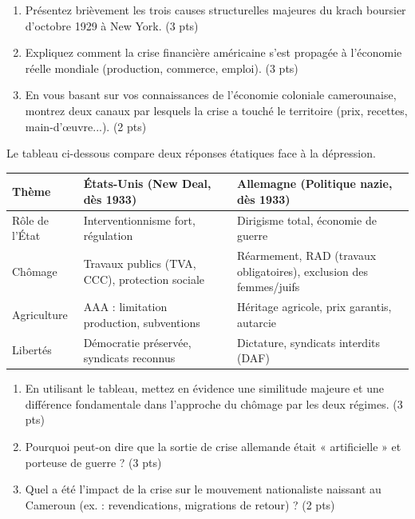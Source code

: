 \documentclass[11pt]{article}
\begin{document}
\begin{exercice}
\begin{enumerate}
    \item Présentez brièvement les trois causes structurelles majeures du krach boursier d'octobre 1929 à New York. (3 pts)
    \item Expliquez comment la crise financière américaine s'est propagée à l'économie réelle mondiale (production, commerce, emploi). (3 pts)
    \item En vous basant sur vos connaissances de l'économie coloniale camerounaise, montrez deux canaux par lesquels la crise a touché le territoire (prix, recettes, main-d'œuvre...). (2 pts)
\end{enumerate}
\end{exercice}

\begin{exercice}
Le tableau ci-dessous compare deux réponses étatiques face à la dépression.

\begin{center}
\begin{tabular}{|p{3.5cm}|p{5.5cm}|p{5.5cm}|}
\hline
\textbf{Thème} & \textbf{États-Unis (New Deal, dès 1933)} & \textbf{Allemagne (Politique nazie, dès 1933)} \\ \hline
Rôle de l'État & Interventionnisme fort, régulation & Dirigisme total, économie de guerre \\ \hline
Chômage & Travaux publics (TVA, CCC), protection sociale & Réarmement, RAD (travaux obligatoires), exclusion des femmes/juifs \\ \hline
Agriculture & AAA : limitation production, subventions & Héritage agricole, prix garantis, autarcie \\ \hline
Libertés & Démocratie préservée, syndicats reconnus & Dictature, syndicats interdits (DAF) \\ \hline
\end{tabular}
\end{center}

\begin{enumerate}
    \item En utilisant le tableau, mettez en évidence une similitude majeure et une différence fondamentale dans l'approche du chômage par les deux régimes. (3 pts)
    \item Pourquoi peut-on dire que la sortie de crise allemande était « artificielle » et porteuse de guerre ? (3 pts)
    \item Quel a été l'impact de la crise sur le mouvement nationaliste naissant au Cameroun (ex. : revendications, migrations de retour) ? (2 pts)
\end{enumerate}
\end{exercice}
\end{document}
